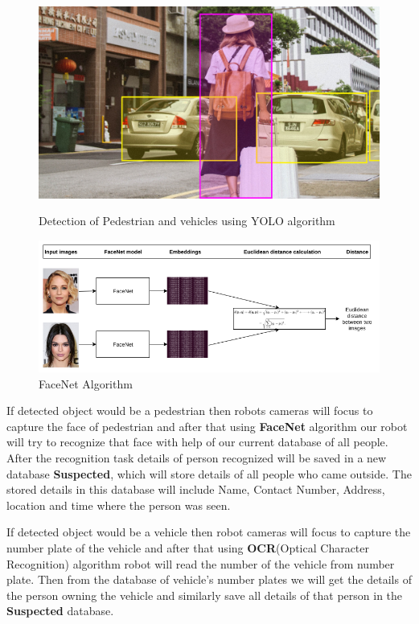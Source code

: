 \documentclass[10pt,twocolumn,letterpaper]{article}
\begin{document}
\begin{figure}[!htb]
	\centering\includegraphics[width=\columnwidth]{object_detection}\\
	\caption{Detection of Pedestrian and vehicles using YOLO algorithm}\label{object_detection}
\end{figure}


\begin{figure}
  \includegraphics[width=\textwidth]{facenet.png}
  \caption{FaceNet Algorithm}
\end{figure}

If detected object would be a pedestrian then robots cameras will focus to capture the face of pedestrian and after that using \textbf{FaceNet} algorithm our robot will try to recognize that face with help of our current database of all people. After the recognition task details of person recognized will be saved in a new database \textbf{Suspected}, which will store details of all people who came outside. The stored details in this database will include Name, Contact Number, Address, location and time where the person was seen.


If detected object would be a vehicle then robot cameras will focus to capture the number plate of the vehicle and after that using \textbf{OCR}(Optical Character Recognition) algorithm robot will read the number of the vehicle from number plate. Then from the database of vehicle's number plates we will get the details of the person owning the vehicle and similarly save all details of that person in the \textbf{Suspected} database.
\end{document}
